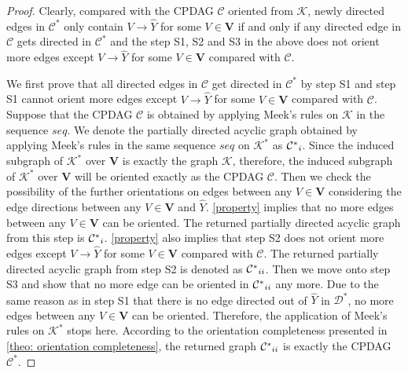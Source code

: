 \documentclass{article} %
\begin{document}
\begin{proof}
    Clearly, compared with the CPDAG $\mathcal{C}$ oriented from $\mathcal{K}$, newly directed edges in $\mathcal{C^{*}}$ only contain $V \rightarrow \hat{Y}$ for some $V \in \mathbf{V}$ if and only if any directed edge in $\mathcal{C}$ gets directed in $\mathcal{C^{*}}$ and the step S1, S2 and S3 in the above does not orient more edges except $V \rightarrow \hat{Y}$ for some $V \in \mathbf{V}$ compared with $\mathcal{C}$.
    
    We first prove that all directed edges in $\mathcal{C}$ get directed in $\mathcal{C^{*}}$ by step S1 and step S1 cannot orient more edges except $V \rightarrow \hat{Y}$ for some $V \in \mathbf{V}$ compared with $\mathcal{C}$. Suppose that the CPDAG $\mathcal{C}$ is obtained by applying Meek's rules on $\mathcal{K}$ in the sequence $seq$. We denote the partially directed acyclic graph obtained by applying Meek's rules in the same sequence $seq$ on $\mathcal{K^{*}}$ as $\mathcal{C^{*}}_{\uppercase\expandafter{\romannumeral1}}$. Since the induced subgraph of $\mathcal{K^{*}}$ over $\mathbf{V}$ is exactly the graph $\mathcal{K}$, therefore, the induced subgraph of $\mathcal{K^{*}}$ over $\mathbf{V}$ will be oriented exactly as the CPDAG $\mathcal{C}$. Then we check the possibility of the further orientations on edges between any $V \in \mathbf{V}$ considering the edge directions between any $V \in \mathbf{V}$ and $\hat{Y}$. 
    \ref{property} implies that no more edges between any $V \in \mathbf{V}$ can be oriented. The returned partially directed acyclic graph from this step is $\mathcal{C^{*}}_{\uppercase\expandafter{\romannumeral1}}$.
    \ref{property} also implies that step S2 does not orient more edges except $V \rightarrow \hat{Y}$ for some $V \in \mathbf{V}$ compared with $\mathcal{C}$. The returned partially directed acyclic graph from step S2 is denoted as $\mathcal{C^{*}}_{\uppercase\expandafter{\romannumeral2}}$.
    Then we move onto step S3 and show that no more edge can be oriented in $\mathcal{C^{*}}_{\uppercase\expandafter{\romannumeral2}}$ any more. Due to the same reason as in step S1 that there is no edge directed out of $\hat{Y}$ in $\mathcal{D^{*}}$, no more edges between any $V \in \mathbf{V}$ can be oriented. Therefore, the application of Meek's rules on $\mathcal{K^{*}}$ stops here. According to the orientation completeness presented in \cref{theo: orientation completeness}, the returned graph $\mathcal{C^{*}}_{\uppercase\expandafter{\romannumeral2}}$ is exactly the CPDAG $\mathcal{C^{*}}$.
\end{proof}    
\end{document}
